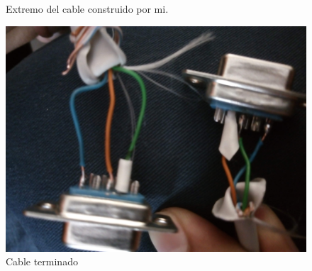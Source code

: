 \documentclass[a4paper,12pt]{article}
\begin{document}
\begin{enumerate}
\begin{figure}[H]
  \caption{Extremo del cable construido por mi.}
 \end{figure}
 \begin{figure}[H]
  \centering
  \includegraphics[scale = 0.05]{2.jpg}
  \caption{Cable terminado}
 \end{figure}
 

\end{enumerate}
\end{document}
